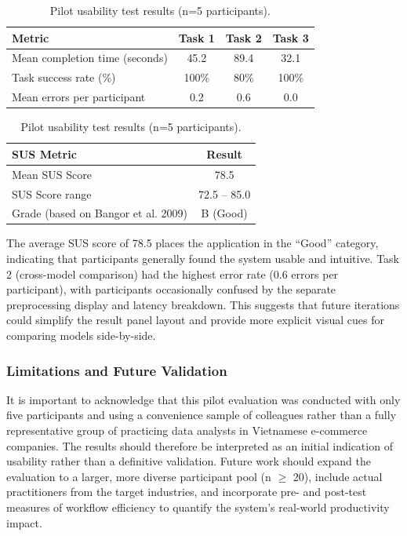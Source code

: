 \documentclass[12pt]{report} %
\begin{document}
\begin{table}[H]
    \centering
    \caption{Pilot usability test results (n=5 participants).}
    \label{tab:usability-results}
    \begin{tabular}{lccc}
        \hline
        \textbf{Metric}                & \textbf{Task 1} & \textbf{Task 2} & \textbf{Task 3} \\
        \hline
        Mean completion time (seconds) & 45.2            & 89.4            & 32.1            \\
        Task success rate (\%)         & 100\%           & 80\%            & 100\%           \\
        Mean errors per participant    & 0.2             & 0.6             & 0.0             \\
        \hline
    \end{tabular}
    \medskip
    \begin{tabular}{lc}
        \hline
        \textbf{SUS Metric}                 & \textbf{Result} \\
        \hline
        Mean SUS Score                      & 78.5            \\
        SUS Score range                     & 72.5 -- 85.0    \\
        Grade (based on Bangor et al. 2009) & B (Good)        \\
        \hline
    \end{tabular}
\end{table}

The average SUS score of 78.5 places the application in the ``Good'' category, indicating that participants generally found the system usable and intuitive. Task 2 (cross-model comparison) had the highest error rate (0.6 errors per participant), with participants occasionally confused by the separate preprocessing display and latency breakdown. This suggests that future iterations could simplify the result panel layout and provide more explicit visual cues for comparing models side-by-side.

\subsubsection{Limitations and Future Validation}

It is important to acknowledge that this pilot evaluation was conducted with only five participants and using a convenience sample of colleagues rather than a fully representative group of practicing data analysts in Vietnamese e-commerce companies. The results should therefore be interpreted as an initial indication of usability rather than a definitive validation. Future work should expand the evaluation to a larger, more diverse participant pool (n $\geq$ 20), include actual practitioners from the target industries, and incorporate pre- and post-test measures of workflow efficiency to quantify the system's real-world productivity impact.
\end{document}
